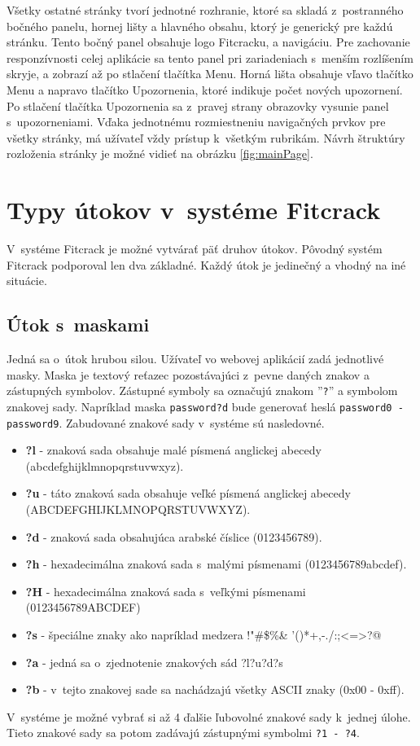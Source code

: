 \documentclass[slovak]{fitthesis}
\begin{document}
Všetky ostatné stránky tvorí jednotné rozhranie, ktoré sa skladá z~postranného bočného panelu, hornej lišty a hlavného obsahu, ktorý je generický pre každú stránku. Tento bočný panel obsahuje logo Fitcracku, a navigáciu. Pre zachovanie responzívnosti celej aplikácie sa tento panel pri zariadeniach  s~menším rozlíšením skryje, a zobrazí až po stlačení tlačítka Menu. Horná lišta obsahuje vľavo tlačítko Menu a napravo tlačítko Upozornenia, ktoré indikuje počet nových upozornení. Po stlačení tlačítka Upozornenia sa z~pravej strany obrazovky vysunie panel s~upozorneniami. Vďaka jednotnému rozmiestneniu navigačných prvkov pre všetky stránky, má užívateľ vždy prístup k~všetkým rubrikám. Návrh štruktúry rozloženia stránky je možné vidieť na obrázku \ref{fig:mainPage}.


\section{Typy útokov v~systéme Fitcrack}
V~systéme Fitcrack je možné vytvárať päť druhov útokov. Pôvodný systém Fitcrack podporoval len dva základné. Každý útok je jedinečný a vhodný na iné situácie.


\subsection{Útok s~maskami} \label{maskAttack}
Jedná sa o~útok hrubou silou. Užívateľ  vo webovej aplikácií zadá jednotlivé masky. Maska je textový reťazec pozostávajúci z~pevne daných znakov a zástupných symbolov. Zástupné symboly sa označujú znakom ''\texttt{?}'' a symbolom znakovej sady. Napríklad maska \texttt{password?d} bude generovať heslá \texttt{password0 - password9}. Zabudované znakové sady v~systéme sú nasledovné.
\begin{itemize}
    \item \textbf{?l} - znaková sada obsahuje malé písmená anglickej abecedy (abcdefghijklmnopqrstuvwxyz).
    \item \textbf{?u} - táto znaková sada obsahuje veľké písmená anglickej abecedy (ABCDEFGHIJKLMNOPQRSTUVWXYZ).
    \item \textbf{?d} - znaková sada obsahujúca arabské číslice (0123456789).
    \item \textbf{?h} - hexadecimálna znaková sada s~malými písmenami (0123456789abcdef).
    \item \textbf{?H} - hexadecimálna znaková sada s~veľkými písmenami (0123456789ABCDEF)
    \item \textbf{?s} - špeciálne znaky ako napríklad medzera !"\#\$\%\&
    '()*+,-./:;<=>?@
    \item \textbf{?a} - jedná sa o~zjednotenie znakových sád ?l?u?d?s
    \item \textbf{?b} - v~tejto znakovej sade sa nachádzajú všetky ASCII znaky (0x00 - 0xff).
\end{itemize}
V~systéme je možné vybrať si až 4 ďalšie ľubovolné znakové sady k~jednej úlohe. Tieto znakové sady sa potom zadávajú zástupnými symbolmi \texttt{?1 - ?4}.
\end{document}
